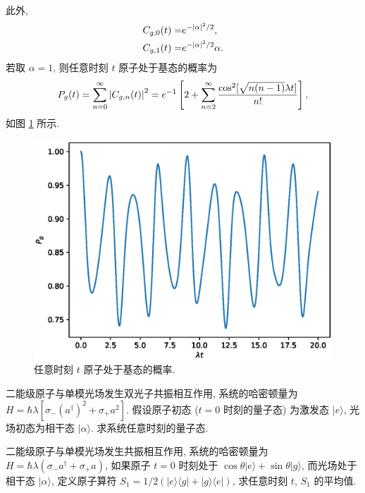 \documentclass{assignment}
\begin{document}
\begin{sol}
\begin{align}
        \end{align}
        此外,
        \begin{align}
            C_{g,0}(t)=&e^{-\left\lvert\alpha\right\rvert^2/2},\\
            C_{g,1}(t)=&e^{-\left\lvert\alpha\right\rvert^2/2}\alpha.
        \end{align}
        若取 $\alpha=1$, 则任意时刻 $t$ 原子处于基态的概率为
        \begin{align}
            P_g(t)=\sum_{n=0}^{\infty}\left\lvert C_{g,n}(t)\right\rvert^2=e^{-1}\left[2+\sum_{n=2}^{\infty}\frac{\cos^2[\sqrt{n(n-1)}\lambda t]}{n!}\right],
        \end{align}
        如图 \ref{2014-8} 所示.
        \begin{figure}[H]
            \centering
            \includegraphics[width=.5\columnwidth]{Figures/2014-8.eps}
            \caption{任意时刻 $t$ 原子处于基态的概率.}
            \label{2014-8}
        \end{figure}
\end{sol}

\begin{prob}
    二能级原子与单模光场发生双光子共振相互作用, 系统的哈密顿量为 $H=\hbar\lambda[\sigma_-(a^{\dagger})^2+\sigma_+a^2]$. 假设原子初态 ($t=0$ 时刻的量子态) 为激发态 $\lvert e\rangle$, 光场初态为相干态 $\lvert\alpha\rangle$. 求系统任意时刻的量子态.
\end{prob}
\begin{sol}
    
\end{sol}

\begin{prob}
    二能级原子与单模光场发生共振相互作用, 系统的哈密顿量为 $H=\hbar\lambda(\sigma_-a^{\dagger}+\sigma_+a)$, 如果原子 $t=0$ 时刻处于 $\cos\theta\lvert e\rangle+\sin\theta\lvert g\rangle$, 而光场处于相干态 $\lvert\alpha\rangle$, 定义原子算符 $S_1=1/2(\lvert e\rangle\langle g\rvert+\lvert g\rangle\langle e\rvert)$, 求任意时刻 $t$, $S_1$ 的平均值.
\end{prob}
\begin{sol}
    
\end{sol}
\end{document}
